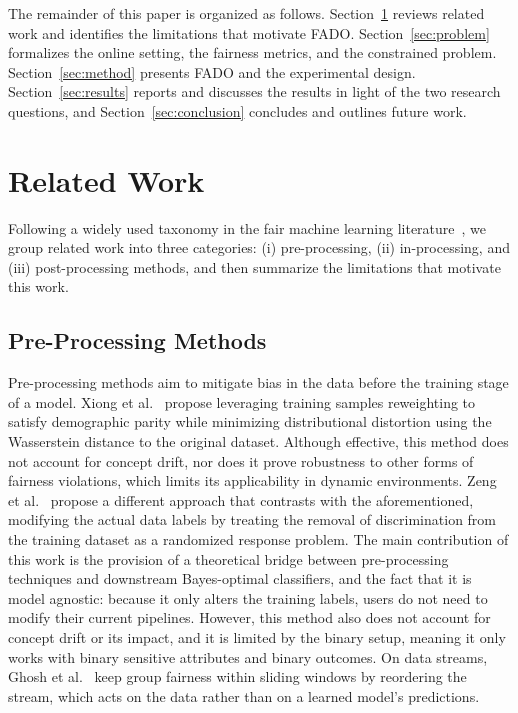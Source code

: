 \documentclass[conference]{IEEEtran}
\newcommand{\fado}{\textsc{FADO}}
\begin{document}
The remainder of this paper is organized as follows. Section~\ref{sec:related} reviews related work and identifies the limitations that motivate \fado{}.
Section~\ref{sec:problem} formalizes the online setting, the fairness metrics, and the constrained problem. Section~\ref{sec:method} presents \fado{} and the
experimental design. Section~\ref{sec:results} reports and discusses the results in light of the two research questions, and Section~\ref{sec:conclusion}
concludes and outlines future work.

\section{Related Work}
\label{sec:related}
Following a widely used taxonomy in the fair machine learning literature~\cite{Salazar_2026}, we group related work into three categories: (i) pre-processing,
(ii) in-processing, and (iii) post-processing methods, and then summarize the limitations that motivate this work.

\subsection{Pre-Processing Methods}
Pre-processing methods aim to mitigate bias in the data before the training stage of a model. Xiong et
al.~\cite{Xiong_Dalmasso_Mishler_Potluru_Balch_Veloso_2024} propose leveraging training samples reweighting to satisfy demographic parity while minimizing
distributional distortion using the Wasserstein distance to the original dataset. Although effective, this method does not account for concept drift, nor does it
prove robustness to other forms of fairness violations, which limits its applicability in dynamic environments. Zeng et
al.~\cite{zeng2024fairrrpreprocessinggroupfairness} propose a different approach that contrasts with the aforementioned, modifying the actual data labels by treating
the removal of discrimination from the training dataset as a randomized response problem. The main contribution of this work is the provision of a theoretical
bridge between pre-processing techniques and downstream Bayes-optimal classifiers, and the fact that it is model agnostic: because it only alters the training
labels, users do not need to modify their current pipelines. However, this method also does not account for concept drift or its impact, and it is limited by
the binary setup, meaning it only works with binary sensitive attributes and binary outcomes. On data streams, Ghosh et al.~\cite{ghosh2026cobloc} keep
group fairness within sliding windows by reordering the stream, which acts on the data rather than on a learned model's predictions.
\end{document}

